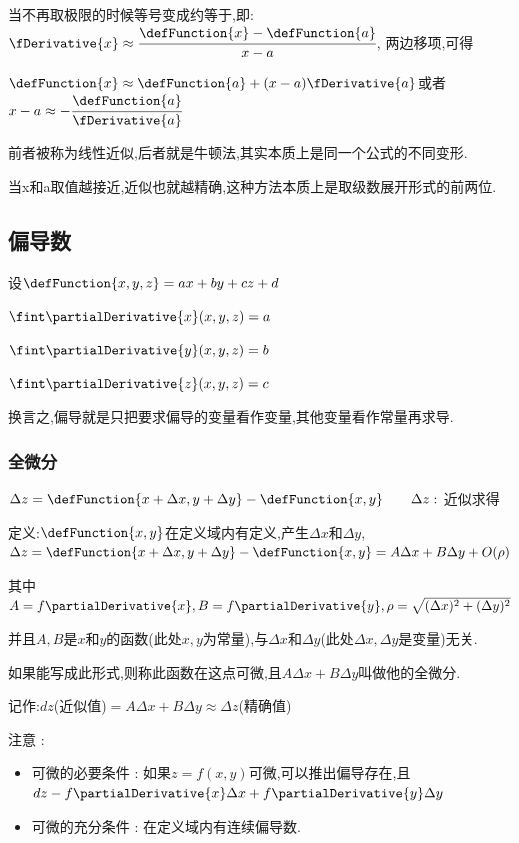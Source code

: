{{{    当不再取极限的时候等号变成约等于,即:$\fDerivative{x} \approx \cfrac{\defFunction{x} - \defFunction{a}}{x - a}$, 两边移项,可得

    $\defFunction{x} \approx \defFunction{a} + (x-a)\fDerivative{a}$或者$x - a \approx -\cfrac{\defFunction{a}}{\fDerivative{a}}$

    前者被称为线性近似,后者就是牛顿法,其实本质上是同一个公式的不同变形.

    当x和a取值越接近,近似也就越精确,这种方法本质上是取级数展开形式的前两位.

  }%

}%

\subsection{偏导数}{

  设$\defFunction{x,y,z} = ax + by + cz + d$

  $\fint\partialDerivative{x}(x,y,z) = a$

  $\fint\partialDerivative{y}(x,y,z) = b$

  $\fint\partialDerivative{z}(x,y,z) = c$

  换言之,偏导就是只把要求偏导的变量看作变量,其他变量看作常量再求导.

  \subsubsection{全微分}{

    $\Delta z = \defFunction{x + \Delta x,y + \Delta y} - \defFunction{x,y}\qquad\Delta z : $ 近似求得

    定义:$\defFunction{x,y}$在定义域内有定义,产生$\Delta x$和$\Delta y$,$\Delta z = \defFunction{x + \Delta x,y + \Delta y} - \defFunction{x,y} = A\Delta x + B\Delta y + O(\rho)$

    其中$A = f\partialDerivative{x}, B = f\partialDerivative{y}, \rho = \sqrt{(\Delta x)^2 + (\Delta y)^2}$

    并且$A,B$是$x$和$y$的函数(此处$x,y$为常量),与$\Delta x$和$\Delta y$(此处$\Delta x, \Delta y$是变量)无关.

    如果能写成此形式,则称此函数在这点可微,且$A\Delta x + B\Delta y$叫做他的全微分.

    记作:$dz$(近似值)$= A\Delta x + B\Delta y \approx \Delta z$(精确值)

    注意 :

    \begin{itemize}
      \item 可微的必要条件 : 如果$z = f(x,y)$可微,可以推出偏导存在,且$dz - f\partialDerivative{x}\Delta x + f\partialDerivative{y}\Delta y$
      \item 可微的充分条件 : 在定义域内有连续偏导数.
    \end{itemize}
  }

}}
